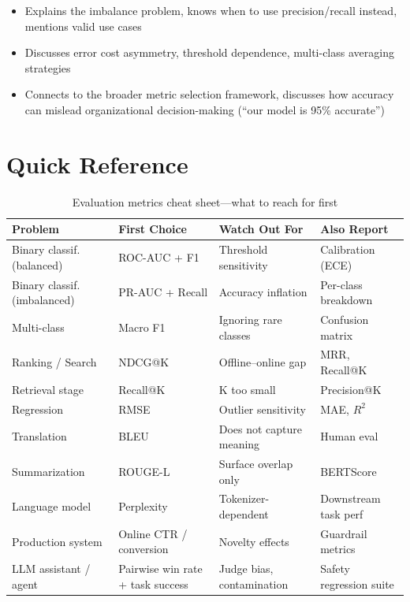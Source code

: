 \begin{interviewq}
\goodgreat
\begin{itemize}
    \item {} Explains the imbalance problem, knows when to use precision/recall instead, mentions valid use cases
    \item {} Discusses error cost asymmetry, threshold dependence, multi-class averaging strategies
    \item {} Connects to the broader metric selection framework, discusses how accuracy can mislead organizational decision-making (``our model is 95\% accurate'')
\end{itemize}

\end{interviewq}

\section{Quick Reference}
\label{sec:metrics_cheatsheet}

\begin{table}[H]
\centering
\caption{Evaluation metrics cheat sheet---what to reach for first}
\begin{tabularx}{\textwidth}{lXXl}
\toprule
\textbf{Problem} & \textbf{First Choice} & \textbf{Watch Out For} & \textbf{Also Report} \\
\midrule
Binary classif. (balanced) & ROC-AUC + F1 & Threshold sensitivity & Calibration (ECE) \\
Binary classif. (imbalanced) & PR-AUC + Recall & Accuracy inflation & Per-class breakdown \\
Multi-class & Macro F1 & Ignoring rare classes & Confusion matrix \\
Ranking / Search & NDCG@K & Offline--online gap & MRR, Recall@K \\
Retrieval stage & Recall@K & K too small & Precision@K \\
Regression & RMSE & Outlier sensitivity & MAE, $R^2$ \\
Translation & BLEU & Does not capture meaning & Human eval \\
Summarization & ROUGE-L & Surface overlap only & BERTScore \\
Language model & Perplexity & Tokenizer-dependent & Downstream task perf \\
Production system & Online CTR / conversion & Novelty effects & Guardrail metrics \\
LLM assistant / agent & Pairwise win rate + task success & Judge bias, contamination & Safety regression suite \\
\bottomrule
\end{tabularx}
\end{table}
